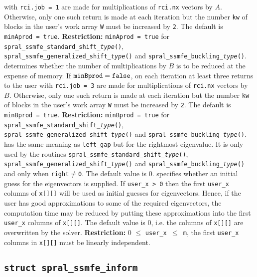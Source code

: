 \begin{description}
with {\tt rci.job = 1} are
made for multiplications of {\tt rci.nx} vectors by $A$.
Otherwise,  only one such return is made at each iteration but 
the number {\tt kw} of blocks in the user's work array {\tt W} 
must be increased by {\tt 2}.
The default is {\tt minAprod~=~true}.
{\bf Restriction:} {\tt minAprod = true}
for {\tt spral\_ssmfe\_standard\_shift\_\textit{type}()},\\
{\tt spral\_ssmfe\_generalized\_shift\_\textit{type}()}
and  {\tt spral\_ssmfe\_buckling\_\textit{type}()}.
%
determines whether the number of multiplications by $B$ 
is to be reduced at the expense of memory. 
If ${\tt minBprod = false}$, 
on each iteration at least three returns to the user
with {\tt rci.job = 3} are
made for multiplications of {\tt rci.nx} vectors by $B$.
Otherwise,  only one such return is made at each iteration but 
the number {\tt kw} of blocks in the user's work array {\tt W} 
must be increased by {\tt 2}.
The default is {\tt minBprod = true}.
{\bf Restriction:} {\tt minBprod = true}
for {\tt spral\_ssmfe\_standard\_shift\_\textit{type}()},\\
{\tt spral\_ssmfe\_generalized\_shift\_\textit{type}()}
and  {\tt spral\_ssmfe\_buckling\_\textit{type}()}.
%
 has the same meaning as {\tt left\_gap} but for the rightmost eigenvalue. It is only used by the routines
{\tt spral\_ssmfe\_standard\_shift\_\textit{type}()}, {\tt spral\_ssmfe\_generalized\_shift\_\textit{type}()}
and {\tt spral\_ssmfe\_buckling\_\textit{type}()}
and only when {\tt right}$\ne${\tt 0}.
The default value is 0.
%
 specifies whether an initial guess for the eigenvectors is supplied.
If {\tt user\_x > 0} then the first {\tt user\_x} columns
of {\tt x[][]} will be used as initial guesses for eigenvectors.
Hence, if the user has good approximations
to some of the required eigenvectors, the computation time
may be reduced by putting these approximations
into the first {\tt user\_x} columns of {\tt x[][]}.
The default value is 0, 
i.e. the columns of {\tt x[][]} are overwritten by the solver.
{\bf Restriction:} {0 $\le$ \tt user\_x $\le$ m},
the first {\tt user\_x} columns in {\tt x[][]}
must be linearly independent.
%
\end{description}

\subsection{\texttt{struct spral\_ssmfe\_inform}}

